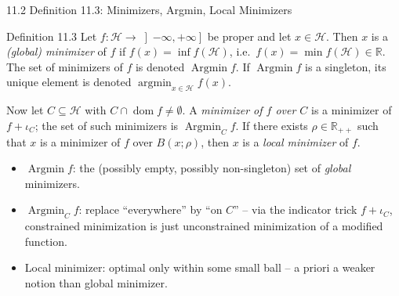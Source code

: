 \documentclass[aspectratio=169,10pt]{beamer}
\newcommand{\mHH}{\mathcal H}
\newcommand{\R}{\mathbb{R}}
\newcommand{\Rpp}{\mathbb{R}_{++}}
\newcommand{\dom}{\operatorname{dom}}
\newcommand{\Argmin}{\operatorname{Argmin}}
\newcommand{\argmin}{\operatorname{argmin}}
\newcommand{\iC}{\iota_C}
\begin{document}
\begin{frame}{11.2 Definition 11.3: Minimizers, Argmin, Local Minimizers}

  \begin{block}{Definition 11.3}
    Let $f:\mHH\to\left]-\infty,+\infty\right]$ be proper and let
    $x\in\mHH$. Then $x$ is a \emph{(global) minimizer} of $f$ if
    $f(x)=\inf f(\mHH)$, i.e.\ $f(x)=\min f(\mHH)\in\R$. The set of
    minimizers of $f$ is denoted $\Argmin f$. If $\Argmin f$ is a
    singleton, its unique element is denoted $\argmin_{x\in\mHH}f(x)$.

    Now let $C\subseteq\mHH$ with $C\cap\dom f\neq\emptyset$. A
    \emph{minimizer of $f$ over $C$} is a minimizer of $f+\iC$; the
    set of such minimizers is $\Argmin_C f$. If there exists
    $\rho\in\Rpp$ such that $x$ is a minimizer of $f$ over
    $B(x;\rho)$, then $x$ is a \emph{local minimizer} of $f$.
  \end{block}

  \begin{itemize}
    \item $\Argmin f$: the (possibly empty, possibly non-singleton)
          set of \emph{global} minimizers.
    \item $\Argmin_C f$: replace ``everywhere'' by ``on $C$'' -- via
          the indicator trick $f+\iC$, constrained minimization is
          just unconstrained minimization of a modified function.
    \item Local minimizer: optimal only within some small ball -- a
          priori a weaker notion than global minimizer.
  \end{itemize}

\end{frame}
\end{document}
